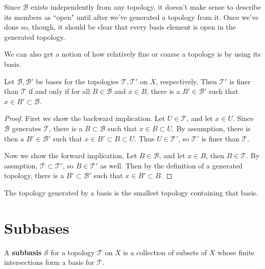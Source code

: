 \documentclass[10pt]{report}
\begin{document}
\begin{note}
Since $\mathcal{B}$ exists independently from any topology, it doesn't make sense to describe its members as ``open" until after we've generated a topology from it. Once we've done so, though, it should be clear that every basis element is open in the generated topology.
\end{note}

We can also get a notion of how relatively fine or coarse a topology is by using its basis.

\begin{prop}
	Let $\mathcal{B}, \mathcal{B}'$ be bases for the topologies $\mathcal{T},\mathcal{T}'$ on $X$, respectively. Then $\mathcal{T}'$ is finer than $\mathcal{T}$ if and only if for all $B \in \mathcal{B}$ and $x \in B$, there is a $B' \in \mathcal{B}'$ such that $x \in B' \subset \mathcal{B}$.
\end{prop}
\begin{proof}
	First we show the backward implication. Let $U \in \mathcal{T}$, and let $x \in U$. Since $\mathcal{B}$ generates $\mathcal{T}$, there is a $B \subset \mathcal{B}$ such that $x \in B \subset U$. By assumption, there is then a $B' \in \mathcal{B}'$ such that $x \in B' \subset B \subset U$. Thus $U \in \mathcal{T}'$, so $\mathcal{T}'$ is finer than $\mathcal{T}$.

	Now we show the forward implication. Let $B \in \mathcal{B}$, and let $x \in B$, then $B \in \mathcal{T}$. By assmption, $\mathcal{T} \subset \mathcal{T}'$, so $B \in \mathcal{T}'$ as well. Then by the definition of a generated topology, there is a $B' \subset \mathcal{B}'$ such that $x \in B' \subset B$.
\end{proof}

\begin{prop}
The topology generated by a basis is the smallest topology containing that basis.
\end{prop}


\section{Subbases}

\begin{defn}
	A \textbf{subbasis} $\mathcal{S}$ for a topology $\mathcal{T}$ on $X$ is a collection of subsets of $X$ whose finite intersections form a basis for $\mathcal{T}$.
\end{defn}
\end{document}
